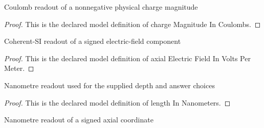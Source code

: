 \begin{definition}
  \label{def:physics:phyx-mini-0630:phyxminiproblems-problemphyxmini0630-chargemagnitudeincoulombs}
  Coulomb readout of a nonnegative physical charge magnitude
\end{definition}
\begin{proof}
  This is the declared model definition of charge Magnitude In Coulombs.
\end{proof}
\begin{definition}
  \label{def:physics:phyx-mini-0630:phyxminiproblems-problemphyxmini0630-axialelectricfieldinvoltspermeter}
  Coherent-SI readout of a signed electric-field component
\end{definition}
\begin{proof}
  This is the declared model definition of axial Electric Field In Volts Per Meter.
\end{proof}
\begin{definition}
  \label{def:physics:phyx-mini-0630:phyxminiproblems-problemphyxmini0630-lengthinnanometers}
  Nanometre readout used for the supplied depth and answer choices
\end{definition}
\begin{proof}
  This is the declared model definition of length In Nanometers.
\end{proof}
\begin{definition}
  \label{def:physics:phyx-mini-0630:phyxminiproblems-problemphyxmini0630-signedpositioninnanometers}
  Nanometre readout of a signed axial coordinate
\end{definition}
